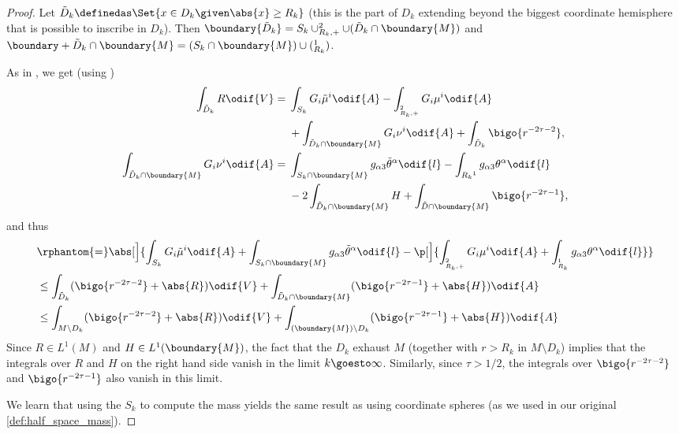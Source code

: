 \documentclass[titlepage,numbers=noenddot,oneside,%
cleardoublepage=empty,paper=a4,fontsize=11pt,%
english,%
]{scrartcl}
\let\sphere\relax
\newcommand{\sphere}{\mathbb{S}}
\begin{document}
\begin{proof}
    Let \( \tilde{D}_k\definedas \Set{x\in D_k\given \abs{x}\geq R_k} \) (this is the part of \( D_k \) extending beyond the biggest coordinate hemisphere that is possible to inscribe in \( D_k \)). Then \( \boundary{\tilde{D}_k}=S_k \cup \sphere^2_{R_k,+}\cup (\tilde{D}_k\cap \boundary{M}) \) and \( \boundary+{\tilde{D}_k\cap \boundary{M}}=(S_k\cap \boundary{M})\cup (\sphere^1_{R_k}) \).



    As in \cite[Proposition 3.7]{almarazPositiveMassTheorem2016}, we get (using \cite[Equations 3.16 and 3.17]{almarazPositiveMassTheorem2016})
    \begin{align*}
        \int_{\tilde{D}_k}{R}\odif{V}&=\begin{aligned}[t]
            &\int_{S_k}G_i\tilde{\mu}^i \odif{A}-\int_{\sphere^2_{R_k,+}}G_i\mu^i\odif{A}\\
            &+\int_{\tilde{D}_k \cap \boundary{M}}G_i\nu^i \odif{A}+\int_{\tilde{D}_k}\bigo{r^{-2\tau-2}},
        \end{aligned}\\
        \int_{\tilde{D}_k\cap \boundary{M}}G_i \nu^i\odif{A}&=\begin{aligned}[t]
            &\int_{S_k\cap \boundary{M}}g_{\alpha 3}\tilde{\theta}^\alpha\odif{l}-\int_{\sphere{R_k}^1}g_{\alpha3}\theta^\alpha\odif{l}\\
            &-2\int_{\tilde{D}_k\cap \boundary{M}}H+\int_{\tilde{D}\cap \boundary{M}}\bigo{r^{-2\tau-1}},
        \end{aligned}
    \end{align*}
    and thus
    \begin{equation*}
        \begin{aligned}[t]
        &\rphantom{=}\abs[\Big]{\int_{S_k}G_i \tilde{\mu}^i \odif{A}+\int_{S_k\cap \boundary{M}}g_{\alpha 3}\tilde{\theta}^\alpha\odif{l}-\p[\Big]{\int_{\sphere^2_{R_k,+}}G_i\mu^i \odif{A}+\int_{\sphere^1_{R_k}}g_{\alpha 3}\theta^\alpha\odif{l}}}\\
        &\leq \int_{\tilde{D}_k}(\bigo{r^{-2\tau-2}}+\abs{R})\odif{V}+\int_{\tilde{D}_k\cap \boundary{M}}(\bigo{r^{-2\tau-1}}+\abs{H})\odif{A}\\
        &\leq \int_{M\setminus D_k}(\bigo{r^{-2\tau-2}}+\abs{R})\odif{V}+\int_{(\boundary{M})\setminus D_k}(\bigo{r^{-2\tau-1}}+\abs{H})\odif{A}\\
        \end{aligned}
    \end{equation*}
    Since \( R\in L^1(M) \) and \( H\in L^1(\boundary{M}) \), the fact that the \( D_k \) exhaust \( M \) (together with \( r>R_k \) in \( M\setminus D_k \)) implies that the integrals over \( R \) and \( H \) on the right hand side vanish in the limit \( k\goesto \infty \). Similarly, since \( \tau>1/2 \), the integrals over \( \bigo{r^{-2\tau-2}} \) and \( \bigo{r^{-2\tau-1}} \) also vanish in this limit. 
     
    We learn that using the \( S_k \) to compute the mass yields the same result as using coordinate spheres (as we used in our original \cref{def:half_space_mass}).
\end{proof}
\end{document}
